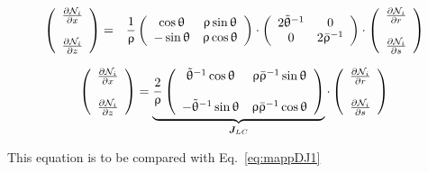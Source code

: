 \begin{eqnarray}
\left(
\begin{array}{c}
\frac{\partial {\mathcal{N}}_i}{\partial x} \\ \\
\frac{\partial {\mathcal{N}}_i}{\partial z} 
\end{array}
\right)
&=&
\frac{1}{\uprho}
\left(
\begin{array}{cc}
\cos \uptheta & \uprho\sin\uptheta \\ 
-\sin\uptheta & \uprho\cos\uptheta
\end{array}
\right)
\cdot
\left(
\begin{array}{cc}
2\tilde{\uptheta}^{-1} & 0 \\
0 &  2\bar{\uprho}^{-1}
\end{array}
\right)
\cdot 
\left(
\begin{array}{c}
\frac{\partial {\mathcal{N}}_i}{\partial r} \\ \\
\frac{\partial {\mathcal{N}}_i}{\partial s} 
\end{array}
\right)  
\end{eqnarray}

\begin{mdframed}[backgroundcolor=blue!5]
\begin{equation}
\left(
\begin{array}{c}
\frac{\partial {\mathcal{N}}_i}{\partial x} \\ \\
\frac{\partial {\mathcal{N}}_i}{\partial z} 
\end{array}
\right)
=
\underbrace{
\frac{2}{\uprho}
\left(
\begin{array}{cc}
\tilde{\uptheta}^{-1} \cos\uptheta & \uprho \bar{\uprho}^{-1} \sin \uptheta\\ \\
-\tilde{\uptheta}^{-1} \sin\uptheta & \uprho \bar{\uprho}^{-1} \cos \uptheta
\end{array}
\right)
}_{{\bm J}_{LC}}
\cdot 
\left(
\begin{array}{c}
\frac{\partial {\mathcal{N}}_i}{\partial r} \\ \\
\frac{\partial {\mathcal{N}}_i}{\partial s} 
\end{array}
\right)  
\end{equation}
\end{mdframed}
This equation is to be compared with Eq.~\eqref{eq:mappDJ1}

